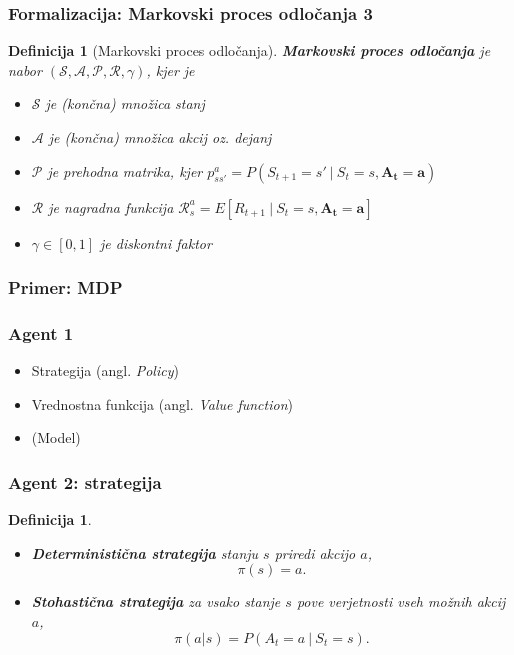 \documentclass{beamer}    %
\newtheorem{definicija}[izrek]{Definicija}
\begin{document}
\begin{frame}
    \frametitle{Formalizacija: Markovski proces odločanja 3}
    \begin{definicija}[Markovski proces odločanja]
        \textbf{Markovski proces odločanja} je nabor 
        $(\mathcal{S}, \mathcal{A}, \mathcal{P}, \mathcal{R}, \gamma)$, kjer je
        \begin{itemize}
            \item $\mathcal{S}$ je (končna) množica stanj
            \item $\mathcal{A}$ je (končna) množica akcij oz. dejanj
            \item $\mathcal{P}$ je prehodna matrika, kjer $p_{ss'}^a = P(S_{t+1} = s'~|~S_{t} = s,
                    \mathbf{A_t = a})$
            \item $\mathcal{R}$ je nagradna funkcija $\mathcal{R}_s^a = E[R_{t+1}~|~S_{t} = s, 
                    \mathbf{A_t = a}]$
            \item $\gamma \in [0, 1]$ je diskontni faktor
        \end{itemize}
    \end{definicija}
\end{frame}


\begin{frame}
    \frametitle{Primer: MDP}
\end{frame}


\begin{frame}
    \frametitle{Agent 1}
    \begin{itemize}
        \item Strategija (angl. \textit{Policy})
        \item Vrednostna funkcija (angl. \textit{Value function})
        \item (Model)
    \end{itemize}
\end{frame}


\begin{frame}
    \frametitle{Agent 2: strategija}
    \begin{definicija}
        \begin{itemize}
            \item \textbf{Deterministična strategija} stanju $s$ priredi akcijo $a$, 
                    $$
                    \pi(s) = a.
                    $$ 
            \item \textbf{Stohastična strategija} za vsako stanje $s$ pove verjetnosti vseh 
                    možnih akcij $a$, 
                    $$
                    \pi(a | s) = P(A_t = a~|~S_t = s).
                    $$
        \end{itemize}
    \end{definicija}
\end{frame}
\end{document}
